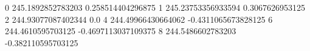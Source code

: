 0 245.1892852783203 0.258514404296875
1 245.23753356933594 0.3067626953125
2 244.93077087402344 0.0
4 244.49966430664062 -0.4311065673828125
6 244.4610595703125 -0.4697113037109375
8 244.5486602783203 -0.382110595703125
